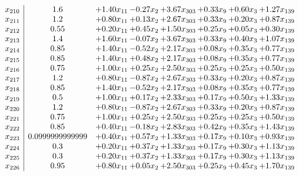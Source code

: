 \documentclass[8pt]{article}
\begin{document}
\[\begin{array}{c| c c@{\hskip 2pt} c@{\hskip 2pt} c@{\hskip 2pt} c@{\hskip 2pt} c@{\hskip 2pt} c@{\hskip 2pt} }
 x_{210}   &  1.6 & +  1.40 x_{11} & -0.27 x_{2} & +  3.67 x_{303} & +  0.33 x_{9} & +  0.60 x_{3} & +  1.27 x_{139}\\
 x_{211}   &  1.2 & +  0.80 x_{11} & +  0.13 x_{2} & +  2.67 x_{303} & +  0.33 x_{9} & +  0.20 x_{3} & +  0.87 x_{139}\\
 x_{212}   &  0.55 & +  0.20 x_{11} & +  0.45 x_{2} & +  1.50 x_{303} & +  0.25 x_{9} & +  0.05 x_{3} & +  0.30 x_{139}\\
 x_{213}   &  1.4 & +  1.60 x_{11} & -0.07 x_{2} & +  3.67 x_{303} & +  0.33 x_{9} & +  0.40 x_{3} & +  1.07 x_{139}\\
 x_{214}   &  0.85 & +  1.40 x_{11} & -0.52 x_{2} & +  2.17 x_{303} & +  0.08 x_{9} & +  0.35 x_{3} & +  0.77 x_{139}\\
 x_{215}   &  0.85 & +  1.40 x_{11} & +  0.48 x_{2} & +  2.17 x_{303} & +  0.08 x_{9} & +  0.35 x_{3} & +  0.77 x_{139}\\
 x_{216}   &  0.75 & +  1.00 x_{11} & +  0.25 x_{2} & +  2.50 x_{303} & +  0.25 x_{9} & +  0.25 x_{3} & +  0.50 x_{139}\\
 x_{217}   &  1.2 & +  0.80 x_{11} & -0.87 x_{2} & +  2.67 x_{303} & +  0.33 x_{9} & +  0.20 x_{3} & +  0.87 x_{139}\\
 x_{218}   &  0.85 & +  1.40 x_{11} & -0.52 x_{2} & +  2.17 x_{303} & +  0.08 x_{9} & +  0.35 x_{3} & +  0.77 x_{139}\\
 x_{219}   &  0.5 & +  1.00 x_{11} & +  0.17 x_{2} & +  2.33 x_{303} & +  0.17 x_{9} & +  0.50 x_{3} & +  1.33 x_{139}\\
 x_{220}   &  1.2 & +  0.80 x_{11} & -0.87 x_{2} & +  2.67 x_{303} & +  0.33 x_{9} & +  0.20 x_{3} & +  0.87 x_{139}\\
 x_{221}   &  0.75 & +  1.00 x_{11} & +  0.25 x_{2} & +  2.50 x_{303} & +  0.25 x_{9} & +  0.25 x_{3} & +  0.50 x_{139}\\
 x_{222}   &  0.85 & +  0.40 x_{11} & -0.18 x_{2} & +  2.83 x_{303} & +  0.42 x_{9} & +  0.35 x_{3} & +  1.43 x_{139}\\
 x_{223}   &  0.0999999999999 & +  0.40 x_{11} & +  0.57 x_{2} & +  1.33 x_{303} & +  0.17 x_{9} & +  0.10 x_{3} & +  0.93 x_{139}\\
 x_{224}   &  0.3 & +  0.20 x_{11} & +  0.37 x_{2} & +  1.33 x_{303} & +  0.17 x_{9} & +  0.30 x_{3} & +  1.13 x_{139}\\
 x_{225}   &  0.3 & +  0.20 x_{11} & +  0.37 x_{2} & +  1.33 x_{303} & +  0.17 x_{9} & +  0.30 x_{3} & +  1.13 x_{139}\\
 x_{226}   &  0.95 & +  0.80 x_{11} & +  0.05 x_{2} & +  2.50 x_{303} & +  0.25 x_{9} & +  0.45 x_{3} & +  1.70 x_{139}\\

\end{array}\]
\end{document}
